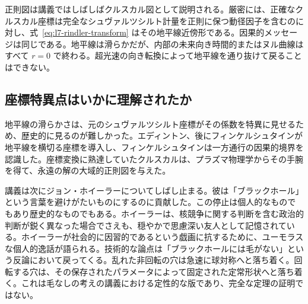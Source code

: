 \begin{classroomqa}
\end{classroomqa}

\begin{classroomqa}
\end{classroomqa}

正則図は講義ではしばしばクルスカル図として説明される。厳密には、正確なクルスカル座標は完全なシュヴァルツシルト計量を正則に保つ動径因子を含むのに対し、式~\eqref{eq:l7-rindler-transform} はその地平線近傍形である。因果的メッセージは同じである。地平線は滑らかだが、内部の未来向き時間的またはヌル曲線はすべて \(r=0\) で終わる。超光速の向き転換によって地平線を通り抜けて戻ることはできない。

\subsection{座標特異点はいかに理解されたか}

地平線の滑らかさは、元のシュヴァルツシルト座標がその係数を特異に見せるため、歴史的に見るのが難しかった。エディントン、後にフィンケルシュタインが地平線を横切る座標を導入し、フィンケルシュタインは一方通行の因果的境界を認識した。座標変換に熟達していたクルスカルは、プラズマ物理学からその手腕を得て、永遠の解の大域的正則図を与えた。

講義は次にジョン・ホイーラーについてしばし止まる。彼は「ブラックホール」という言葉を避けがたいものにするのに貢献した。この停止は個人的なものでもあり歴史的なものでもある。ホイーラーは、核競争に関する判断を含む政治的判断が鋭く異なった場合でさえも、穏やかで思慮深い友人として記憶されている。ホイーラーが社会的に因習的であるという戯画に抗するために、ユーモラスな個人的逸話が語られる。技術的な論点は「ブラックホールには毛がない」という反論において戻ってくる。乱れた非回転の穴は急速に球対称へと落ち着く。回転する穴は、その保存されたパラメータによって固定された定常形状へと落ち着く。これは毛なしの考えの講義における定性的な版であり、完全な定理の証明ではない。


